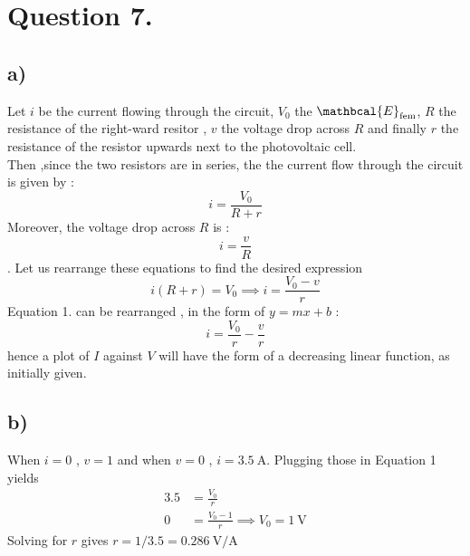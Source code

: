 \documentclass[
	12pt,
	]{article}
\theoremstyle{definition}
\theoremstyle{definition}
\theoremstyle{definition}
\theoremstyle{definition}
\theoremstyle{definition}
\theoremstyle{example}
\theoremstyle{note}
\theoremstyle{remark}
\theoremstyle{example}
\begin{document}
		  \section{Question 7.}
		  	\subsection{a) }
		  		Let $i$ be the current flowing through the circuit, $V_{0}$ the $\mathbcal{E}_{\text{fem}}$, $R$ the resistance of the right-ward resitor , $v$ the voltage drop across $R$ and finally $r$ the resistance of the resistor upwards next to the photovoltaic cell. \\
		  		Then ,since the two resistors are in series, the the current flow through the circuit is given by :  
		  		$$ i = \frac{V_{0}}{R + r}$$
		  		Moreover, the voltage drop across $R$ is : 
		  		$$ i = \frac{v}{R}$$.
		  		Let us rearrange these equations to find the desired expression 
		  		\begin{equation}
		  			i(R + r) = V_{0} \implies i = \frac{V_{0} - v}{r}
		  		\end{equation}
		  		Equation 1. can be rearranged , in the form of $y = mx +b$ : 
		  		$$ i = \frac{V_{0}}{r} - \frac{v}{r}$$
		  		hence a plot of $I$ against $V$ will have the form of a decreasing linear function, as initially given.
			\subsection{b) } 
				When $i = 0$ , $v = 1$ and when $v= 0$ , $i = 3.5 \ \si{\ampere}$. Plugging those in Equation 1 yields 
				\begin{align*}
					3.5 &= \frac{V_{0}}{r} \\
					0 &= \frac{V_{0} -1}{r} \implies V_{0} = 1 \ \si{\volt} 
				\end{align*}						  		
		  		Solving for $r$ gives $r = 1/3.5 = 0.286 \ \si{\volt\per\ampere}$
\end{document}
